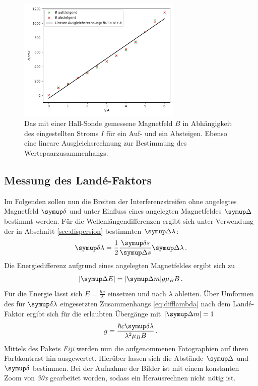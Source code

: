 \begin{figure}
  \centering
  \includegraphics[width=0.7\textwidth]{plots/eichung.pdf}
  \caption{Das mit einer Hall-Sonde gemessene Magnetfeld $B$ in Abhängigkeit des eingestellten Stroms $I$ für ein Auf- und ein Absteigen. Ebenso eine lineare Ausgleichsrechnung zur Bestimmung des Wertepaarzusammenhangs.}
  \label{abb:eichung}
\end{figure}
\clearpage
\subsection{Messung des Landé-Faktors}
Im Folgenden sollen nun die Breiten der Interferenzstreifen ohne angelegtes Magnetfeld $\deltaup$ und unter Einfluss eines angelegten Magnetfeldes $\Deltaup$ bestimmt werden.
Für die Wellenlängendifferenzen ergibt sich unter Verwendung der in Abschnitt \ref{sec:dispersion} bestimmten $\Deltaup \lambda$:
\begin{equation}
  \deltaup \lambda = \frac{1}{2}\frac{\deltaup s}{\Deltaup s}\Deltaup \lambda\,.
  \label{eq:difflambda}
\end{equation}
Die Energiedifferenz aufgrund eines angelegten Magnetfeldes ergibt sich zu
\begin{equation}
  |\Deltaup E| = |\Deltaup m| g \mu_B B\,.
\end{equation}
Für die Energie lässt sich $E=\frac{\hbar c}{\lambda}$ einsetzen und nach $\lambda$ ableiten.
Über Umformen des für $\deltaup \lambda$ eingesetzten Zusammenhangs \eqref{eq:difflambda} nach dem Landé-Faktor ergibt sich für die erlaubten Übergänge mit $|\Deltaup m|=1$
\begin{equation}
  g=\frac{\hbar c \deltaup \lambda}{\lambda^2 \mu_B B}\,.
  \label{eq:g}
\end{equation}
Mittels des Pakets \textit{Fiji} werden nun die aufgenommenen Fotographien auf ihren Farbkontrast hin ausgewertet.
Hierüber lassen sich die Abstände $\Deltaup$ und $\deltaup$ bestimmen.
Bei der Aufnahme der Bilder ist mit einem konstanten Zoom von \textit{30x} gearbeitet worden, sodass ein Herausrechnen nicht nötig ist.
